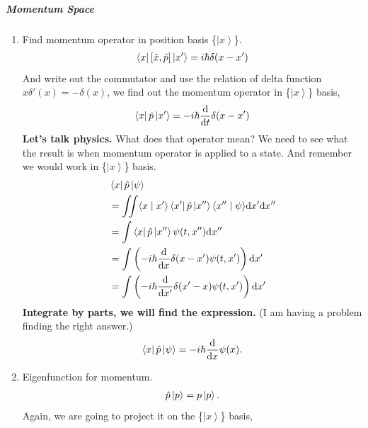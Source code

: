 \documentclass[letterpaper,10pt,english]{sphinxmanual}
\def\d{{\rm d}}
\newcommand{\bra}[1]{\left\langle #1\right|}
\newcommand{\ket}[1]{\left| #1\right\rangle}
\newcommand{\braket}[2]{\langle #1 \mid #2 \rangle}
\begin{document}
\subparagraph{Momentum Space}
\label{Quantum/QuantumMechanics:id1}\begin{enumerate}
\item {} 
Find momentum operator in position basis \{\(\ket{x}\)\}.
\begin{gather}
\begin{split}\bra{x} \left[ \hat x, \hat p\right] \ket{x'} = i\hbar \delta(x-x')\end{split}\notag
\end{gather}
And write out the commutator and use the relation of delta function \(x\delta'(x) = -\delta(x)\), we find out the momentum operator in \{\(\ket{x}\)\} basis,
\begin{gather}
\begin{split}\bra{x}\hat p \ket{x'} = -i\hbar \frac{\d }{\d t} \delta(x-x')\end{split}\notag
\end{gather}
\textbf{Let's talk physics.} What does that operator mean? We need to see what the result is when momentum operator is applied to a state. And remember we would work in \{\(\ket{x}\)\} basis.
\begin{gather}
\begin{split}&\bra{x} \hat p \ket{\psi} \\
& =  \iint \braket{x}{x'} \bra{x'} \hat p \ket{x''}\braket{x''}{\psi} \d x' \d x''  \\
& =  \int \bra{x}\hat p \ket{x''}\psi(t,x'') \d x'' \\
& =  \int \left( -i\hbar \frac{\d}{\d x} \delta(x-x') \psi(t,x') \right) \d x' \\
& =  \int \left( -i\hbar \frac{\d}{\d x'} \delta(x'-x) \psi(t,x') \right) \d x'\end{split}\notag
\end{gather}
\textbf{Integrate by parts, we will find the expression.} (I am having a problem finding the right answer.)
\begin{gather}
\begin{split}\bra{x} \hat p \ket{\psi} = - i\hbar \frac{\d }{\d x}\psi(x) .\end{split}\notag
\end{gather}
\item {} 
Eigenfunction for momentum.
\begin{gather}
\begin{split}\hat p \ket{p} = p \ket{p} .\end{split}\notag
\end{gather}
Again, we are going to project it on the \{\(\ket{x}\)\} basis,

\end{enumerate}
\end{document}
